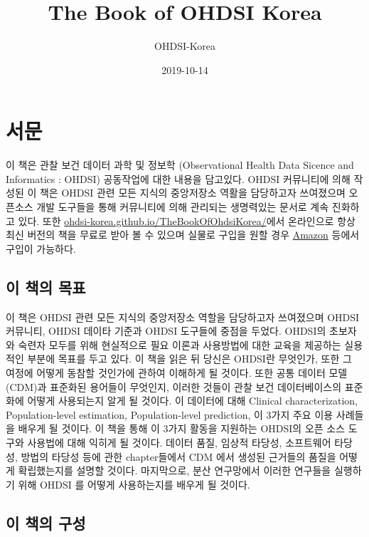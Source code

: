 \documentclass[11pt]{book}
\title{The Book of OHDSI Korea}
\author{OHDSI-Korea}
\date{2019-10-14}
\theoremstyle{definition}
\theoremstyle{definition}
\theoremstyle{definition}
\theoremstyle{remark}
\begin{document}
\maketitle

{
\setcounter{tocdepth}{1}
\tableofcontents
}
\chapter*{서문}

 이 책은 관찰 보건 데이터 과학 및 정보학 (Observational Health Data
Sicence and Informatics : OHDSI) 공동작업에 대한 내용을 담고있다. OHDSI
커뮤니티에 의해 작성된 이 책은 OHDSI 관련 모든 지식의 중앙저장소 역활을
담당하고자 쓰여졌으며 오픈소스 개발 도구들을 통해 커뮤니티에 의해
관리되는 생명력있는 문서로 계속 진화하고 있다. 또한
\href{https://ohdsi-korea.github.io/TheBookOfOhdsiKorea/}{ohdsi-korea.github.io/TheBookOfOhdsiKorea/}에서
온라인으로 항상 최신 버전의 책을 무료로 받아 볼 수 있으며 실물로 구입을
원할 경우
\href{https://www.amazon.com/OHDSI-Observational-Health-Sciences-Informatics/dp/1088855199}{Amazon}
등에서 구입이 가능하다.

\section*{이 책의 목표}\label{--}

이 책은 OHDSI 관련 모든 지식의 중앙저장소 역할을 담당하고자 쓰여졌으며
OHDSI 커뮤니티, OHDSI 데이타 기준과 OHDSI 도구들에 중점을 두었다.
OHDSI의 초보자와 숙련자 모두를 위해 현실적으로 필요 이론과 사용방법에
대한 교육을 제공하는 실용적인 부분에 목표를 두고 있다. 이 책을 읽은 뒤
당신은 OHDSI란 무엇인가, 또한 그 여정에 어떻게 동참할 것인가에 관하여
이해하게 될 것이다. 또한 공통 데이터 모델(CDM)과 표준화된 용어들이
무엇인지, 이러한 것들이 관찰 보건 데이터베이스의 표준화에 어떻게
사용되는지 알게 될 것이다. 이 데이터에 대해 Clinical characterization,
Population-level estimation, Population-level prediction, 이 3가지 주요
이용 사례들을 배우게 될 것이다. 이 책을 통해 이 3가지 활동을 지원하는
OHDSI의 오픈 소스 도구와 사용법에 대해 익히게 될 것이다. 데이터 품질,
임상적 타당성, 소프트웨어 타당성, 방법의 타당성 등에 관한 chapter들에서
CDM 에서 생성된 근거들의 품질을 어떻게 확립했는지를 설명할 것이다.
마지막으로, 분산 연구망에서 이러한 연구들을 실행하기 위해 OHDSI 를
어떻게 사용하는지를 배우게 될 것이다.

\section*{이 책의 구성}\label{--}
\end{document}
